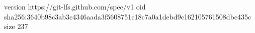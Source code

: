 version https://git-lfs.github.com/spec/v1
oid sha256:3640b98c3ab3c4346aada3f5608751c18c7a0a1debd9c162105761508dbc435c
size 237
